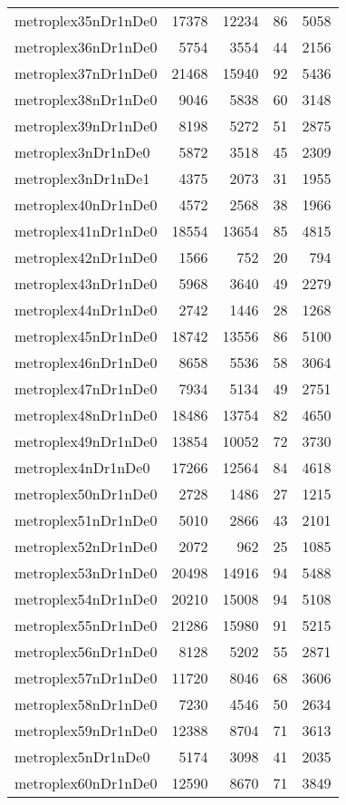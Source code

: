 \begin{longtable}{lrrrr}
metroplex35nDr1nDe0 & 17378 & 12234 & 86 & 5058 \\
metroplex36nDr1nDe0 & 5754 & 3554 & 44 & 2156 \\
metroplex37nDr1nDe0 & 21468 & 15940 & 92 & 5436 \\
metroplex38nDr1nDe0 & 9046 & 5838 & 60 & 3148 \\
metroplex39nDr1nDe0 & 8198 & 5272 & 51 & 2875 \\
metroplex3nDr1nDe0 & 5872 & 3518 & 45 & 2309 \\
metroplex3nDr1nDe1 & 4375 & 2073 & 31 & 1955 \\
metroplex40nDr1nDe0 & 4572 & 2568 & 38 & 1966 \\
metroplex41nDr1nDe0 & 18554 & 13654 & 85 & 4815 \\
metroplex42nDr1nDe0 & 1566 & 752 & 20 & 794 \\
metroplex43nDr1nDe0 & 5968 & 3640 & 49 & 2279 \\
metroplex44nDr1nDe0 & 2742 & 1446 & 28 & 1268 \\
metroplex45nDr1nDe0 & 18742 & 13556 & 86 & 5100 \\
metroplex46nDr1nDe0 & 8658 & 5536 & 58 & 3064 \\
metroplex47nDr1nDe0 & 7934 & 5134 & 49 & 2751 \\
metroplex48nDr1nDe0 & 18486 & 13754 & 82 & 4650 \\
metroplex49nDr1nDe0 & 13854 & 10052 & 72 & 3730 \\
metroplex4nDr1nDe0 & 17266 & 12564 & 84 & 4618 \\
metroplex50nDr1nDe0 & 2728 & 1486 & 27 & 1215 \\
metroplex51nDr1nDe0 & 5010 & 2866 & 43 & 2101 \\
metroplex52nDr1nDe0 & 2072 & 962 & 25 & 1085 \\
metroplex53nDr1nDe0 & 20498 & 14916 & 94 & 5488 \\
metroplex54nDr1nDe0 & 20210 & 15008 & 94 & 5108 \\
metroplex55nDr1nDe0 & 21286 & 15980 & 91 & 5215 \\
metroplex56nDr1nDe0 & 8128 & 5202 & 55 & 2871 \\
metroplex57nDr1nDe0 & 11720 & 8046 & 68 & 3606 \\
metroplex58nDr1nDe0 & 7230 & 4546 & 50 & 2634 \\
metroplex59nDr1nDe0 & 12388 & 8704 & 71 & 3613 \\
metroplex5nDr1nDe0 & 5174 & 3098 & 41 & 2035 \\
metroplex60nDr1nDe0 & 12590 & 8670 & 71 & 3849 \\

\end{longtable}

